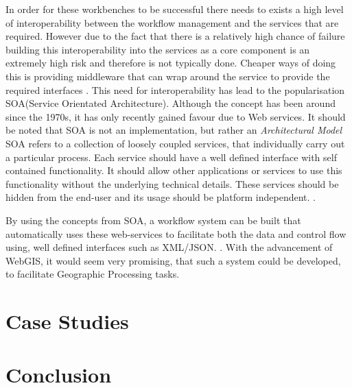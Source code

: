 \documentclass[11pt,twocolumn]{article}
\begin{document}
    In order for these workbenches to be successful there needs
    to exists a high level of interoperability between the
    workflow management and the services that are required.
    However due to the fact that there is a relatively  high
    chance of failure building this interoperability into the
    services as a core component is an extremely high risk
    and therefore is not typically done. Cheaper ways of
    doing this is providing middleware that can wrap around
    the service to provide the required interfaces
    \cite{Shegalov:2001:XWM:767132.767139}.
    This need for interoperability has lead to the
    popularisation SOA(Service Orientated Architecture).
    Although the concept has been around since the 1970s,
    it has only recently gained favour due to Web services.
    It should be noted that SOA is not an implementation,
    but rather an \emph{Architectural Model}
    SOA refers to a collection of loosely coupled services,
    that individually carry out a particular process. Each
    service should have a well defined interface with self
    contained functionality. It should allow other applications
    or services to use this functionality without the underlying
    technical details. These services should be hidden from the
    end-user and its usage should be platform independent.
    \cite{Sanders:2008:SSA:1400549.1400595}.

    By using the concepts from SOA, a workflow system can
    be built that automatically uses these web-services
    to facilitate both the data and control flow using,
    well defined interfaces such as XML/JSON.
    \cite{Shegalov:2001:XWM:767132.767139}. With the
    advancement of WebGIS, it would seem very promising,
    that such a system could be developed, to facilitate
    Geographic Processing tasks.


\section{Case Studies}

\section{Conclusion}


{}

\end{document}
